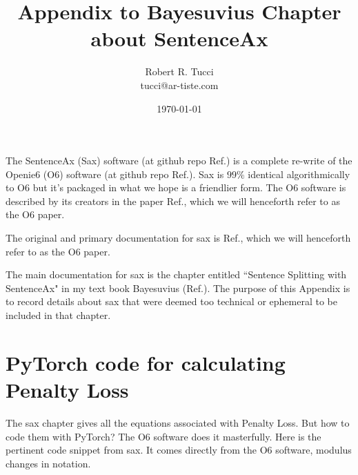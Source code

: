 \documentclass[12pt]{article}
\begin{document}
\title{Appendix
to Bayesuvius Chapter about SentenceAx}
\date{ \today}
\author{Robert R. Tucci\\
        tucci@ar-tiste.com}
\maketitle
The SentenceAx (Sax) software (at github repo Ref.\cite{sentence-ax-github}) is a complete re-write of the Openie6 (O6) software
(at github repo Ref.\cite{openie6-github}).
Sax is $99\%$ identical algorithmically to O6 but it's packaged in what we hope is a friendlier form.
 The O6 software is described by its creators
 in the paper Ref.\cite{openie6-paper},
 which we will henceforth refer to as 
 the O6 paper.
 
 The original and primary documentation 
 for sax is Ref.\cite{openie6-paper}, which we will henceforth refer to as 
 the O6 paper.
 

The main documentation for sax is
the chapter entitled ``Sentence Splitting with SentenceAx" in my text book Bayesuvius (Ref.\cite{bayesuvius}). The purpose of this Appendix is to record details about sax that were deemed too technical or ephemeral to be included in that chapter.


\section{PyTorch code for calculating Penalty Loss}

The sax chapter gives all the equations
associated with Penalty Loss. But how to  code them with PyTorch?  The O6 software does it masterfully. Here is the pertinent code snippet from sax.
It comes directly from the O6 software, modulus changes in notation.
\end{document}
